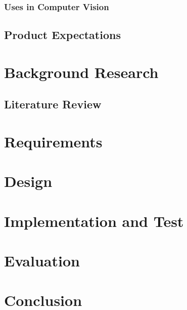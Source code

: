\documentclass[12pt,a4paper]{report}
\begin{document}
			\subsection{Uses in Computer Vision}
		\section{Product Expectations}
		
	\chapter{Background Research}
		\section{Literature Review}
	\chapter{Requirements}
	\chapter{Design}
	\chapter{Implementation and Test}
	\chapter{Evaluation}
	\chapter{Conclusion}

	
	
\end{document}
